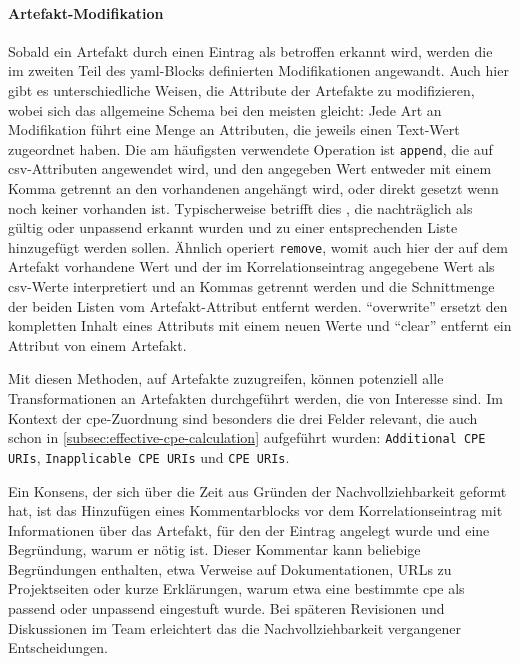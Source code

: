\paragraph{Artefakt-Modifikation}
Sobald ein Artefakt durch einen Eintrag als betroffen erkannt wird, werden die im zweiten Teil des \acrshort{yaml}-Blocks definierten Modifikationen angewandt.
Auch hier gibt es unterschiedliche Weisen, die Attribute der Artefakte zu modifizieren, wobei sich das allgemeine Schema bei den meisten gleicht:
Jede Art an Modifikation führt eine Menge an Attributen, die jeweils einen Text-Wert zugeordnet haben.
Die am häufigsten verwendete Operation ist \texttt{append}, die auf \acrfull{csv}-Attributen angewendet wird, und den angegeben Wert entweder mit einem Komma getrennt an den vorhandenen angehängt wird, oder direkt gesetzt wenn noch keiner vorhanden ist.
Typischerweise betrifft dies , die nachträglich als gültig oder unpassend erkannt wurden und zu einer entsprechenden Liste hinzugefügt werden sollen.
Ähnlich operiert \texttt{remove}, womit auch hier der auf dem Artefakt vorhandene Wert und der im Korrelationseintrag angegebene Wert als \acrshort{csv}-Werte interpretiert und an Kommas getrennt werden und die Schnittmenge der beiden Listen vom Artefakt-Attribut entfernt werden.
\enquote{overwrite} ersetzt den kompletten Inhalt eines Attributs mit einem neuen Werte und \enquote{clear} entfernt ein Attribut von einem Artefakt.

\bigskip

Mit diesen Methoden, auf Artefakte zuzugreifen, können potenziell alle Transformationen an Artefakten durchgeführt werden, die von Interesse sind.
Im Kontext der \acrshort{cpe}-Zuordnung sind besonders die drei Felder relevant, die auch schon in \autoref{subsec:effective-cpe-calculation} aufgeführt wurden:
\texttt{Additional CPE URIs}, \texttt{Inapplicable CPE URIs} und \texttt{CPE URIs}.

Ein Konsens, der sich über die Zeit aus Gründen der Nachvollziehbarkeit geformt hat, ist das Hinzufügen eines Kommentarblocks vor dem Korrelationseintrag mit Informationen über das Artefakt, für den der Eintrag angelegt wurde und eine Begründung, warum er nötig ist.
Dieser Kommentar kann beliebige Begründungen enthalten, etwa Verweise auf Dokumentationen, URLs zu Projektseiten oder kurze Erklärungen, warum etwa eine bestimmte \acrshort{cpe} als passend oder unpassend eingestuft wurde.
Bei späteren Revisionen und Diskussionen im Team erleichtert das die Nachvollziehbarkeit vergangener Entscheidungen.

